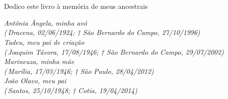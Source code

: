 
\chapter*{}

\vspace*{\fill}

\begin{minipage}[c]{1\textwidth}

\raggedleft

\scriptsize Dedico este livro à memória de meus ancestrais

\bigskip
\emph{Antônia Ângela, minha avó\\
(\mystar \,Dracena, 02/06/1924; † São Bernardo do Campo, 27/10/1996)\\
\medskip
Tadeu, meu pai de criação\\
(\mystar \,Joaquim Távora, 17/08/1946; † São Bernardo do Campo, 29/07/2002)\\
\medskip
Marineuza, minha mãe\\
(\mystar \,Marília, 17/03/1946; † São Paulo, 28/04/2012)\\
\medskip
João Olavo, meu pai\\
(\mystar \,Santos, 25/10/1948; † Cotia, 19/04/2014)}
\end{minipage}

\thispagestyle{empty}
